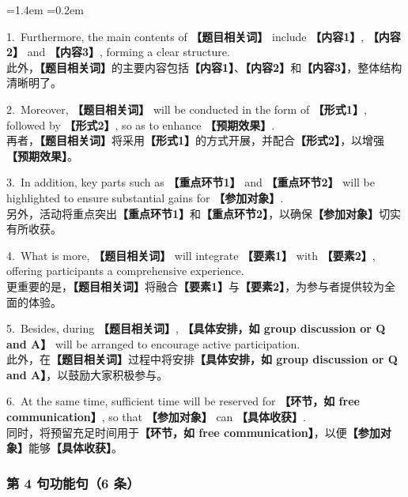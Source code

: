 \documentclass[11pt,a4paper]{ctexart}
\newcommand{\fillin}[1]{{\bfseries【#1】}}
\newenvironment{eg}{%
  \par\addvspace{4pt}%
  \begin{list}{}{\leftmargin=1.4em \rightmargin=0.2em \listparindent=0pt
    \itemindent=0pt \topsep=0pt \parsep=2pt \itemsep=2pt \partopsep=0pt}%
  \item\relax
}{%
  \end{list}\addvspace{5pt}%
}
\begin{document}
\begin{eg}
1.\ Furthermore, the main contents of \fillin{题目相关词} include \fillin{内容1}, \fillin{内容2} and \fillin{内容3}, forming a clear structure.\\
此外，\fillin{题目相关词}的主要内容包括\fillin{内容1}、\fillin{内容2}和\fillin{内容3}，整体结构清晰明了。

2.\ Moreover, \fillin{题目相关词} will be conducted in the form of \fillin{形式1}, followed by \fillin{形式2}, so as to enhance \fillin{预期效果}.\\
再者，\fillin{题目相关词}将采用\fillin{形式1}的方式开展，并配合\fillin{形式2}，以增强\fillin{预期效果}。

3.\ In addition, key parts such as \fillin{重点环节1} and \fillin{重点环节2} will be highlighted to ensure substantial gains for \fillin{参加对象}.\\
另外，活动将重点突出\fillin{重点环节1}和\fillin{重点环节2}，以确保\fillin{参加对象}切实有所收获。

4.\ What is more, \fillin{题目相关词} will integrate \fillin{要素1} with \fillin{要素2}, offering participants a comprehensive experience.\\
更重要的是，\fillin{题目相关词}将融合\fillin{要素1}与\fillin{要素2}，为参与者提供较为全面的体验。

5.\ Besides, during \fillin{题目相关词}, \fillin{具体安排，如 group discussion or Q and A} will be arranged to encourage active participation.\\
此外，在\fillin{题目相关词}过程中将安排\fillin{具体安排，如 group discussion or Q and A}，以鼓励大家积极参与。

6.\ At the same time, sufficient time will be reserved for \fillin{环节，如 free communication}, so that \fillin{参加对象} can \fillin{具体收获}.\\
同时，将预留充足时间用于\fillin{环节，如 free communication}，以便\fillin{参加对象}能够\fillin{具体收获}。
\end{eg}

\subsubsection{第 4 句功能句（6 条）}
\end{document}
